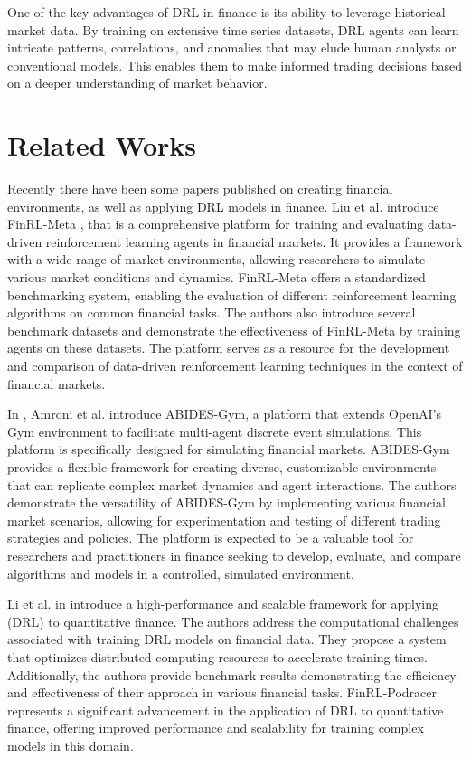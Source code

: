 {One of the key advantages of DRL in finance is its ability to leverage historical market data. By training on extensive time series datasets, DRL agents can learn intricate patterns, correlations, and anomalies that may elude human analysts or conventional models. This enables them to make informed trading decisions based on a deeper understanding of market behavior.


\section{Related Works}
Recently there have been some papers published on creating financial environments,\cite{liu2022finrl,amrouni2021abides,ardon2021towards,coletta2021towards,xiong2018practical,yang2020deep,zhang2019deep} as well as applying DRL models in finance. 
Liu et al. introduce FinRL-Meta  \cite{liu2022finrl}, that is a comprehensive platform for training and evaluating data-driven reinforcement learning agents in financial markets. It provides a framework with a wide range of market environments, allowing researchers to simulate various market conditions and dynamics. FinRL-Meta offers a standardized benchmarking system, enabling the evaluation of different reinforcement learning algorithms on common financial tasks. The authors also introduce several benchmark datasets and demonstrate the effectiveness of FinRL-Meta by training agents on these datasets. The platform serves as a resource for the development and comparison of data-driven reinforcement learning techniques in the context of financial markets.

 
In \cite{amrouni2021abides}, Amroni et al. 
introduce ABIDES-Gym, a platform that extends OpenAI's Gym environment to facilitate multi-agent discrete event simulations. This platform is specifically designed for simulating financial markets. ABIDES-Gym provides a flexible framework for creating diverse, customizable environments that can replicate complex market dynamics and agent interactions. The authors demonstrate the versatility of ABIDES-Gym by implementing various financial market scenarios, allowing for experimentation and testing of different trading strategies and policies. The platform is expected to be a valuable tool for researchers and practitioners in finance seeking to develop, evaluate, and compare algorithms and models in a controlled, simulated environment.

Li et al. in \cite{li2021finrl} introduce a high-performance and scalable framework for applying (DRL) to quantitative finance. The authors address the computational challenges associated with training DRL models on financial data. They propose a system that optimizes distributed computing resources to accelerate training times. Additionally, the authors provide benchmark results demonstrating the efficiency and effectiveness of their approach in various financial tasks. FinRL-Podracer represents a significant advancement in the application of DRL to quantitative finance, offering improved performance and scalability for training complex models in this domain.

}
